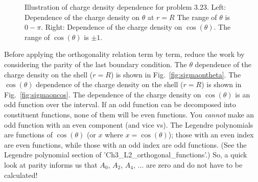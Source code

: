 \documentclass[12pt]{article}
\begin{document}
\begin{flushleft}
\begin{figure}[h]
\begin{center}
\hspace{0.2in}
\end{center}
\caption{\small Illustration of charge density dependence for problem 3.23.  Left: Dependence of the charge density on $\theta$ at $r=R$  The range of $\theta$ is $0-\pi$.  Right: Dependence of the charge density on $\cos{(\theta)}$.  The range of $\cos{(\theta)}$ is $\pm 1$.}
\label{fig:chargedensity}
\end{figure}

Before applying the orthogonality relation term by term, reduce the work by considering the parity of the last boundary condition.  The $\theta$ dependence of the charge density on the shell ($r=R$) is shown in Fig.~\ref{fig:sigmaontheta}.  The $\cos{(\theta)}$ dependence of the charge density on the shell ($r=R$) is shown in Fig.~\ref{fig:sigmaoncos}.  The dependence of the charge density on $\cos{(\theta)}$ is an odd function over the interval.  If an odd function can be decomposed into constituent functions, none of them will be even functions.  You \textit{cannot} make an odd function with an even component (and vice vs).  The Legendre polynomials are functions of $\cos{(\theta)}$ (or $x$ where $x=\cos{(\theta)}$); those with an even index are even functions, while those with an odd index are odd functions.  (See the Legendre polynomial section of 'Ch3\_L2\_orthogonal\_functions'.)  So, a quick look at parity informs us that $A_{0}$, $A_{2}$, $A_{4}$, $\ldots$ are zero and do not have to be calculated! 


\end{flushleft}
\end{document}
